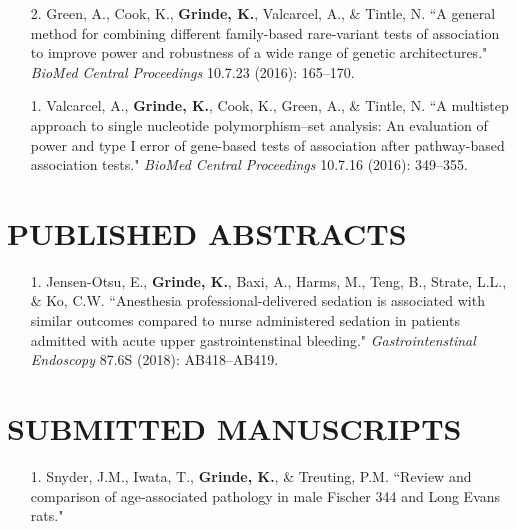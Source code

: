 \documentclass[margin]{res}
\begin{document}
\begin{resume}
\begin{itemize}
\item[2.] Green, A., Cook, K., \textbf{Grinde, K.}, Valcarcel, A., \& Tintle, N. ``A general method for combining different family-based rare-variant tests of association to improve power and robustness of a wide range of genetic architectures." \textit{BioMed Central Proceedings} 10.7.23 (2016): 165--170.

\item[1.] Valcarcel, A., \textbf{Grinde, K.}, Cook, K., Green, A., \& Tintle, N. ``A multistep approach to single nucleotide polymorphism--set analysis: An evaluation of power and type I error of gene-based tests of association after pathway-based association tests." \textit{BioMed Central Proceedings} 10.7.16 (2016): 349--355. \\
\end{itemize}

\section{PUBLISHED ABSTRACTS}

\begin{itemize}
\item[1.] Jensen-Otsu, E., \textbf{Grinde, K.}, Baxi, A., Harms, M., Teng, B., Strate, L.L., \& Ko, C.W. 
``Anesthesia professional-delivered sedation is associated with similar outcomes compared to nurse administered sedation in patients admitted with acute upper gastrointenstinal bleeding." \textit{Gastrointenstinal Endoscopy} 87.6S (2018):  AB418--AB419.\\
\end{itemize}


\section{SUBMITTED MANUSCRIPTS}
\begin{itemize}
\item[1.] Snyder, J.M., Iwata, T., \textbf{Grinde, K.}, \& Treuting, P.M. 
``Review and comparison of age-associated pathology in male Fischer 344 and Long Evans rats."  \\
\end{itemize}




\end{resume}
\end{document}
